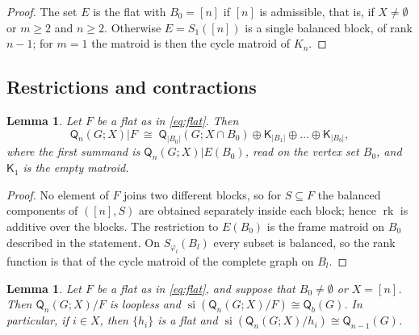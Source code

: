 \documentclass[11pt]{amsart}
\newtheorem{lemma}[theorem]{Lemma}
\theoremstyle{definition}
\theoremstyle{remark}
\numberwithin{equation}{section}
\newcommand{\Q}{\mathsf{Q}}
\newcommand{\K}{\mathsf{K}}
\newcommand{\rk}{\operatorname{rk}}
\newcommand{\si}{\operatorname{si}}
\begin{document}
\begin{proof}
The set $E$ is the flat with $B_0=[n]$ if $[n]$ is admissible, that is, if $X\neq\emptyset$ or $m\ge2$ and $n\ge2$. Otherwise $E=S_1([n])$ is a single balanced block, of rank $n-1$; for $m=1$ the matroid is then the cycle matroid of $K_n$.
\end{proof}

\subsection{Restrictions and contractions}

\begin{lemma}\label{lem:restriction}
Let $F$ be a flat as in \eqref{eq:flat}. Then
\[
\Q_n(G;X)|F\;\cong\;\Q_{|B_0|}(G;X\cap B_0)\oplus\K_{|B_1|}\oplus\dots\oplus\K_{|B_b|},
\]
where the first summand is $\Q_n(G;X)|E(B_0)$, read on the vertex set $B_0$, and $\K_1$ is the empty matroid.
\end{lemma}

\begin{proof}
No element of $F$ joins two different blocks, so for $S\subseteq F$ the balanced components of $([n],S)$ are obtained separately inside each block; hence $\rk$ is additive over the blocks. The restriction to $E(B_0)$ is the frame matroid on $B_0$ described in the statement. On $S_{\varphi_l}(B_l)$ every subset is balanced, so the rank function is that of the cycle matroid of the complete graph on $B_l$.
\end{proof}

\begin{lemma}\label{lem:contraction}
Let $F$ be a flat as in \eqref{eq:flat}, and suppose that $B_0\neq\emptyset$ or $X=[n]$. Then $\Q_n(G;X)/F$ is loopless and $\si(\Q_n(G;X)/F)\cong\Q_b(G)$. In particular, if $i\in X$, then $\{h_i\}$ is a flat and $\si(\Q_n(G;X)/h_i)\cong\Q_{n-1}(G)$.
\end{lemma}
\end{document}
